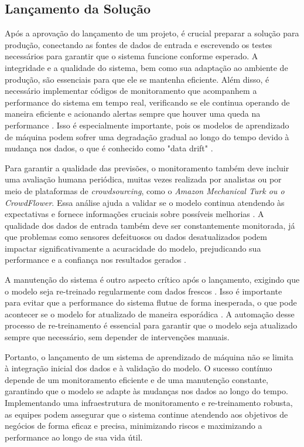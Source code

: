 \subsection{Lançamento da Solução}
Após a aprovação do lançamento de um projeto, é crucial preparar a solução para produção, conectando as fontes de dados de entrada e escrevendo os testes necessários para garantir que o sistema funcione conforme esperado. A integridade e a qualidade do sistema, bem como sua adaptação ao ambiente de produção, são essenciais para que ele se mantenha eficiente. Além disso, é necessário implementar códigos de monitoramento que acompanhem a performance do sistema em tempo real, verificando se ele continua operando de maneira eficiente e acionando alertas sempre que houver uma queda na performance \cite{geron2017}. Isso é especialmente importante, pois os modelos de aprendizado de máquina podem sofrer uma degradação gradual ao longo do tempo devido à mudança nos dados, o que é conhecido como "data drift" \cite{geron2017}.

Para garantir a qualidade das previsões, o monitoramento também deve incluir uma avaliação humana periódica, muitas vezes realizada por analistas ou por meio de plataformas de \textit{crowdsourcing}, como o \textit{Amazon Mechanical Turk ou o CrowdFlower}. Essa análise ajuda a validar se o modelo continua atendendo às expectativas e fornece informações cruciais sobre possíveis melhorias  \cite{muller2017}. A qualidade dos dados de entrada também deve ser constantemente monitorada, já que problemas como sensores defeituosos ou dados desatualizados podem impactar significativamente a acuracidade do modelo, prejudicando sua performance e a confiança nos resultados gerados  \cite{muller2017}.

A manutenção do sistema é outro aspecto crítico após o lançamento, exigindo que o modelo seja re-treinado regularmente com dados frescos \cite{geron2017}. Isso é importante para evitar que a performance do sistema flutue de forma inesperada, o que pode acontecer se o modelo for atualizado de maneira esporádica \cite{geron2017}. A automação desse processo de re-treinamento é essencial para garantir que o modelo seja atualizado sempre que necessário, sem depender de intervenções manuais. 

Portanto, o lançamento de um sistema de aprendizado de máquina não se limita à integração inicial dos dados e à validação do modelo. O sucesso contínuo depende de um monitoramento eficiente e de uma manutenção constante, garantindo que o modelo se adapte às mudanças nos dados ao longo do tempo. Implementando uma infraestrutura de monitoramento e re-treinamento robusta, as equipes podem assegurar que o sistema continue atendendo aos objetivos de negócios de forma eficaz e precisa, minimizando riscos e maximizando a performance ao longo de sua vida útil.